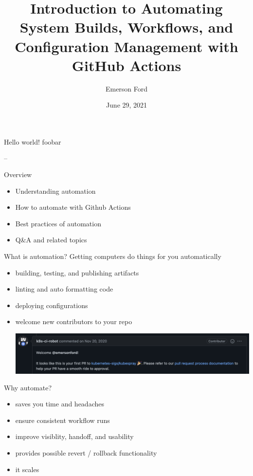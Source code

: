 \documentclass{beamer}
\title{Introduction to Automating System Builds, Workflows, and Configuration Management with GitHub Actions}
\date{June 29, 2021}
\author{Emerson Ford}
\institute{University of Utah --- ITX Meeting}
\begin{document}
\maketitle

\begin{frame}{Hello world!}
    foobar

    --
\end{frame}

\begin{frame}{Overview}
    \begin{itemize}
        \item Understanding automation
        \item How to automate with Github Actions
        \item Best practices of automation
        \item Q\&A and related topics
    \end{itemize}
\end{frame}

\begin{frame}{What is automation?}
    Getting computers do things for you automatically
    \begin{itemize}
        \item building, testing, and publishing artifacts
        \item linting and auto formatting code
        \item deploying configurations
        \item welcome new contributors to your repo \begin{minipage}{\linewidth}\vspace{2pt}\includegraphics[width=0.8\linewidth]{welcome.png}\end{minipage}
    \end{itemize}
\end{frame}

\begin{frame}{Why automate?}
    \begin{itemize}
        \item saves you time and headaches
        \item ensure consistent workflow runs
        \item improve visiblity, handoff, and usability
        \item provides possible revert / rollback functionality
        \item it scales
    \end{itemize}
\end{frame}
\end{document}
